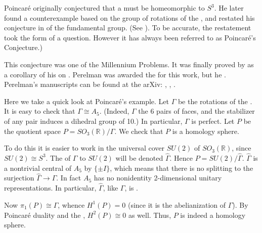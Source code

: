 \documentclass[12pt]{article}
\begin{document}
Poincar\'e originally conjectured \cite{poincare1900} that a  must be homeomorphic to $S^3$.   He later found a counterexample based on the group of rotations of the 
, and restated his conjecture in  of the fundamental group.  (See \cite{poincare1904}).  To be accurate, the restatement took the form of a question.  However it has always been referred to as Poincar\'e's Conjecture.)  

This conjecture was one of the   Millennium Problems.  It was finally proved by  as a 
corollary of his  on . Perelman was awarded the  for this work, but he 
. 
 Perelman's manuscripts can be found at the arXiv: \cite{perelman2002a}, \cite{perelman2002b},
\cite{perelman2002c}.
 


Here we take a quick look at Poincar\'e's example.  Let $\Gamma$ be the rotations of the 
.  It is easy to check that $\Gamma\cong A_5$.  (Indeed, $\Gamma$  the 6 pairs of  faces, and the stabilizer of any pair induces a dihedral group of  10.)  In particular, $\Gamma$ is perfect.  Let $P$ be the quotient space $P=SO_{3}(\mathbb{R})/\Gamma$.  We check that $P$ is a homology sphere.

To do this it is easier to work in the universal cover $SU(2)$ of $SO_{3}(\mathbb{R})$, since $SU(2)\cong S^3$.  The  of $\Gamma$ to $SU(2)$ will be denoted $\hat\Gamma$.  Hence $P=SU(2)/\hat\Gamma$.  $\hat\Gamma$ is a nontrivial central  of $A_5$ by $\{\pm I\}$, which means that there is no splitting to the surjection $\hat\Gamma\to\Gamma$.  In fact $A_5$ has no nonidentity 2-dimensional unitary representations.  In particular, $\hat\Gamma$, like $\Gamma$, is .  

Now $\pi_1(P)\cong\hat\Gamma$, whence $H^1(P)=0$ (since it is the abelianization of $\hat\Gamma$).  By Poincar\'e duality and the , $H^2(P)\cong0$ as well.  Thus, $P$ is indeed a homology sphere.
\end{document}
